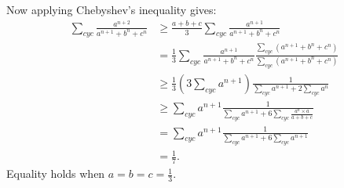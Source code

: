 \documentclass{article}
\begin{document}
\begin{enumerate}
Now applying Chebyshev's inequality gives:
\begin{align*} 
	\sum_{cyc}\frac{a^{n+2}}{a^{n+1}+b^{n}+c^{n}} &\geq \frac{a+b+c}{3}\sum_{cyc}\frac{a^{n+1}}{a^{n+1}+b^{n}+c^{n}} \\
	&=\frac{1}{3}\sum_{cyc}\frac{a^{n+1}}{a^{n+1}+b^{n}+c^{n}}\frac{\sum_{cyc}(a^{n+1}+b^{n}+c^{n})}{\sum_{cyc}(a^{n+1}+b^{n}+c^{n})} \\
	&\geq \frac{1}{3}(3\sum_{cyc}a^{n+1})\frac{1}{\sum_{cyc}a^{n+1}+2\sum_{cyc}a^{n}} \\
	&\geq \sum_{cyc}a^{n+1}\frac{1}{\sum_{cyc}a^{n+1}+6\sum_{cyc}\frac{a^{n}\times a}{a+b+c}} \\
	&= \sum_{cyc}a^{n+1}\frac{1}{\sum_{cyc}a^{n+1}+6\sum_{cyc}a^{n+1}} \\
	&=\frac{1}{7}.
\end{align*}
Equality holds when $a=b=c=\frac{1}{3}$.

\end{enumerate}
\end{document}
